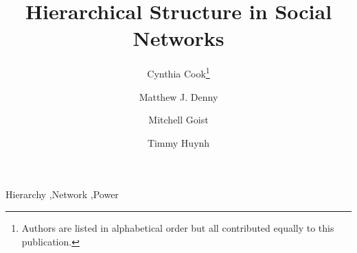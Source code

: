 \documentclass[3p,times]{elsarticle}
\begin{document}
\begin{frontmatter}




\title{Hierarchical Structure in Social Networks}


\author[au1]{Cynthia Cook\footnote{Authors are listed in alphabetical order but all contributed equally to this publication.}} 
\author[au2]{Matthew J. Denny}
\author[au3]{Mitchell Goist} 
\author[au4]{Timmy Huynh}

\address[au1]{Department of Statistics cmc496@psu.edu}
\address[au2]{Department of Political Science, mzd5530@psu.edu}
\address[au1]{Department of Political Science mlg307@psu.edu}
\address[au2]{Department of Sociology and Criminology, tnh133@psu.edu}

\begin{abstract}

\end{abstract}

\begin{keyword}
Hierarchy \sep Network \sep Power


\end{keyword}

\end{frontmatter}

\end{document}
